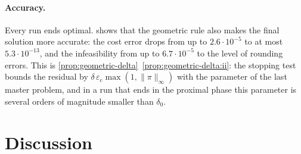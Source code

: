 \paragraph{Accuracy.} Every run ends optimal.  shows that the
geometric rule also makes the final solution more accurate: the cost error drops from up to
$2.6\cdot10^{-5}$ to at most $5.3\cdot10^{-13}$, and the infeasibility from up to
$6.7\cdot10^{-5}$ to the level of rounding errors. This is
\cref{prop:geometric-delta}~\ref{prop:geometric-delta:ii}: the stopping test bounds the
residual by $\delta\,\varepsilon_{\mathrm{c}}\max(1,\lVert\pi\rVert_\infty)$ with the
parameter of the last master problem, and in a run that ends in the proximal phase this
parameter is several orders of magnitude smaller than $\delta_0$.

\section{Discussion}
\label{sec:discussion}

